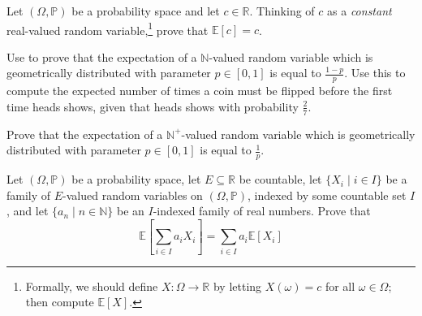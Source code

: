 \begin{exercise}
Let $(\Omega,\mathbb{P})$ be a probability space and let $c \in \mathbb{R}$. Thinking of $c$ as a \textit{constant} real-valued random variable,\footnote{Formally, we should define $X : \Omega \to \mathbb{R}$ by letting $X(\omega)=c$ for all $\omega \in \Omega$; then compute $\mathbb{E}[X]$.} prove that $\mathbb{E}[c]=c$.
\end{exercise}


\begin{exercise}
\label{exExpectationOfGeometric}
Use  to prove that the expectation of a $\mathbb{N}$-valued random variable which is geometrically distributed with parameter $p \in [0,1]$ is equal to $\frac{1-p}{p}$. Use this to compute the expected number of times a coin must be flipped before the first time heads shows, given that heads shows with probability $\frac{2}{7}$.
\end{exercise}

\begin{exercise}
\label{exExpectationOfGeometricPositive}
Prove that the expectation of a $\mathbb{N}^+$-valued random variable which is geometrically distributed with parameter $p \in [0,1]$ is equal to $\frac{1}{p}$.
\end{exercise}



\begin{exercise}
Let $(\Omega,\mathbb{P})$ be a probability space, let $E \subseteq \mathbb{R}$ be countable, let $\{ X_i \mid i \in I \}$ be a family of $E$-valued random variables on $(\Omega,\mathbb{P})$, indexed by some countable set $I$, and let $\{ a_n \mid n \in \mathbb{N} \}$ be an $I$-indexed family of real numbers. Prove that
\[ \mathbb{E} \left[ \sum_{i \in I} a_i X_i \right] = \sum_{i \in I} a_i\mathbb{E}[X_i] \]
\end{exercise}

